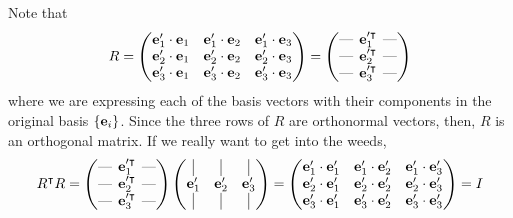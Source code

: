 \documentclass{../../template/note}
\begin{document}
    Note that
    \begin{align*}
        R = \begin{pmatrix}
         \V e_1' \cdot \V e_1 & \V e_1' \cdot \V e_2 & \V e_1' \cdot \V e_3 \\
         \V e_2' \cdot \V e_1 & \V e_2' \cdot \V e_2 & \V e_2' \cdot \V e_3 \\
         \V e_3' \cdot \V e_1 & \V e_3' \cdot \V e_2 & \V e_3' \cdot \V e_3 \\
        \end{pmatrix} = \begin{pmatrix}
         \lln & \V e_1'^\intercal & \rln \\ 
         \lln & \V e_2'^\intercal & \rln \\ 
         \lln & \V e_3'^\intercal & \rln \\
        \end{pmatrix}
    \end{align*}
    where we are expressing each of the basis vectors with their components in the original basis \(\{\V e_i\}\). Since the three rows of \(R\) are orthonormal vectors, then, \(R\) is an orthogonal matrix. If we really want to get into the weeds,
    \begin{align*}
        R^\intercal R = \begin{pmatrix}
            \lln & \V e_1'^\intercal & \rln \\ 
            \lln & \V e_2'^\intercal & \rln \\ 
            \lln & \V e_3'^\intercal & \rln \\ 
        \end{pmatrix} \begin{pmatrix}
            \vline & \vline & \vline \\ 
            \V e_1' & \V e_2' & \V e_3' \\
            \vline & \vline & \vline \\ 
        \end{pmatrix} = \begin{pmatrix}
            \V e_1' \cdot \V e_1' & \V e_1' \cdot \V e_2' & \V e_1' \cdot \V e_3' \\
            \V e_2' \cdot \V e_1' & \V e_2' \cdot \V e_2' & \V e_2' \cdot \V e_3' \\
            \V e_3' \cdot \V e_1' & \V e_3' \cdot \V e_2' & \V e_3' \cdot \V e_3' \\
        \end{pmatrix} = I
    \end{align*}
\end{document}
